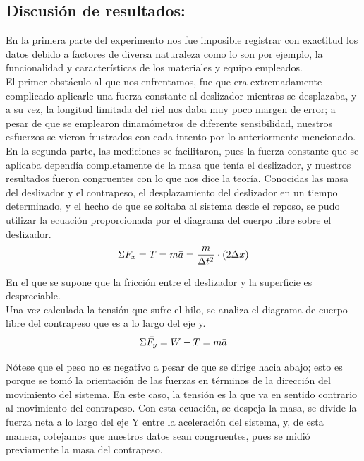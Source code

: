 \documentclass{article}
\begin{document}
\subsection{Discusión de resultados:}
En la primera parte del experimento nos fue imposible registrar con exactitud los datos debido a factores de diversa naturaleza como lo son por ejemplo, la funcionalidad y características de los materiales y equipo empleados.\\
El primer obstáculo al que nos enfrentamos, fue que era extremadamente complicado aplicarle una fuerza constante al deslizador mientras se desplazaba, y a su vez, la longitud limitada del riel nos daba muy poco margen de error; a pesar de que se emplearon dinamómetros de diferente sensibilidad, nuestros esfuerzos se vieron frustrados con cada intento por lo anteriormente mencionado.\\

En la segunda parte, las mediciones se facilitaron, pues la fuerza constante que se aplicaba dependía completamente de la masa que tenía el deslizador, y nuestros resultados fueron congruentes con lo que nos dice la teoría. Conocidas las masa del deslizador y el contrapeso, el desplazamiento del deslizador en un tiempo determinado, y el hecho de que se soltaba al sistema desde el reposo, se pudo utilizar la ecuación proporcionada por el diagrama del cuerpo libre sobre el deslizador.\\
\begin{equation}
    \Sigma F_{x} = T = m\Bar{a} = \frac{m}{\Delta t^{2}} \cdot (2\Delta x)
\end{equation}

En el que se supone que la fricción entre el deslizador y la superficie es despreciable. \\
Una vez calculada la tensión que sufre el hilo, se analiza el diagrama de cuerpo libre del contrapeso que es a lo largo del eje y.\\
\begin{equation}
    \Sigma \Bar{F_{y}} = W - T = m\Bar{a}
\end{equation}

Nótese que el peso no es negativo a pesar de que se dirige hacia abajo; esto es porque se tomó la orientación de las fuerzas en términos de la dirección del movimiento del sistema. En este caso, la tensión es la que va en sentido contrario al movimiento del contrapeso.
Con esta ecuación, se despeja la masa, se divide la fuerza neta a lo largo del eje Y entre la aceleración del sistema, y, de esta manera, cotejamos que nuestros datos sean congruentes, pues se midió previamente la masa del contrapeso.\\
\end{document}
